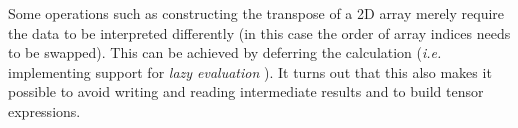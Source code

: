 \documentclass[12pt,a4paper,oneside,openright]{book}
\newcommand{\ie}{\emph{i.e.} }
\newcommand{\Ie}{That is, }
\newcommand{\lst}[1]{Listing~\ref{lst:#1}}
\newcommand{\code}[1]{``\texttt{\textbf{\textcolor{codegray}{\small{#1}}}}''}
\begin{document}
\begin{CJK}{UTF8}{}
Some operations such as constructing the transpose of a \ac{2D} array merely require the data to be interpreted differently (in this case the order of array indices needs to be swapped). This can be achieved by deferring the calculation (\ie implementing support for \emph{lazy evaluation} \citep{abelson1996structure}). It turns out that this also makes it possible to avoid writing and reading intermediate results and to build tensor expressions.


\end{CJK}
\end{document}
